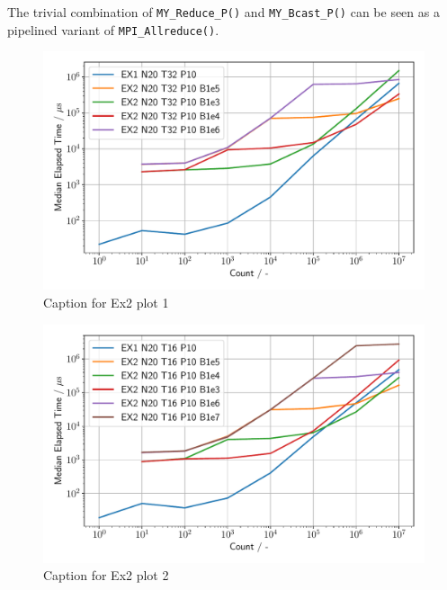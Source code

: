 The trivial combination of \texttt{MY\_Reduce\_P()} and \texttt{MY\_Bcast\_P()} can be seen as a pipelined variant 
of \texttt{MPI\_Allreduce()}.\\

\begin{figure}[h]
    \begin{center}
        \includegraphics[width=1.0\linewidth]{figures/Ex2_1.pdf}
        \caption{Caption for Ex2 plot 1}
        \label{Ex2_1_p}
    \end{center}
\end{figure}

\begin{figure}[h]
    \begin{center}
        \includegraphics[width=1.0\linewidth]{figures/Ex2_2.pdf}
        \caption{Caption for Ex2 plot 2}
        \label{Ex2_2_p}
    \end{center}
\end{figure}

